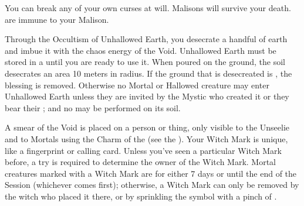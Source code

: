 You can break any of your own curses at will. Malisons will survive your death.   are immune to your Malison.

\cbreak

\OCCULT[
  Name=Unhallowed Earth,
  Link=occultism-unhallowed-earth,
  Pips=2,
  Time=Days
]

Through the Occultism of Unhallowed Earth, you desecrate a handful of earth and imbue it with the chaos energy of the Void. Unhallowed Earth must be stored in a  until you are ready to use it. When poured on the ground, the soil desecrates an area 10 meters in radius. If the ground that is desecreated is , the blessing is removed. Otherwise no Mortal or Hallowed creature may enter Unhallowed Earth unless they are invited by the Mystic who created it or they bear their ; and no  may be performed on its soil.



\OCCULT[
  Name=Witch Mark,
  Link=occultism-witch-mark,
  Pips=1,
  Time=Days
]

A smear of the Void is placed on a person or thing, only visible to the Unseelie and to Mortals using the Charm of the  (see the ). Your Witch Mark is unique, like a fingerprint or calling card. Unless you've seen a particular Witch Mark before, a  try is required to determine the owner of the Witch Mark. Mortal creatures marked with a Witch Mark are  for either 7 days or until the end of the Session (whichever comes first); otherwise, a Witch Mark can only be removed by the witch who placed it there, or by sprinkling the symbol with a pinch of .
